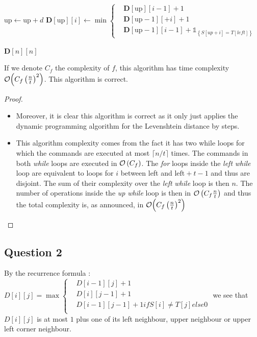 \documentclass{cours}
\begin{document}
\begin{algorithm}
\begin{algorithmic}
                \EndFor
            \EndWhile
            \State $\text{up} \gets \text{up} + d$
                    \State $\mathbf{D}[\text{up}][i] \gets \min{\begin{cases}&\mathbf{D}[\text{up}][i - 1] + 1 \\ &\mathbf{D}[\text{up} - 1][ + i] + 1\\ &\mathbf{D}[\text{up} - 1][i - 1] + \mathds{1}_{\left\{S[up + i] = T[left]\right\}} \end{cases}}$ \\ 
                \EndFor
        \EndWhile\\

        \Return $\mathbf{D}[n][n]$
    
    \end{algorithmic}
\end{algorithm}
\begin{proposition}
    If we denote $C_{f}$ the complexity of $f$, this algorithm has time complexity $\mathcal{O}{\left(C_{f}\left(\frac{n}{t}\right)^{2}\right)}$. This algorithm is correct.
\end{proposition}
\begin{proof}
    \begin{itemize}
        \item Moreover, it is clear this algorithm is correct as it only just applies the dynamic programming algorithm for the Levenshtein distance by steps.
        \item This algorithm complexity comes from the fact it has two while loops for which the commands are executed at most $\lceil n/t \rceil$ times. The commands in both \emph{while} loops are executed in $\mathcal{O}\left(C_{f}\right)$. The \emph{for} loops inside the \textit{left} \emph{while} loop are equivalent to loops for $i$ between left and $\text{left} + t - 1$ and thus are disjoint. The sum of their complexity over the \textit{left} \emph{while} loop is then $n$. The number of operations inside the \textit{up} \emph{while} loop is then in $\mathcal{O}\left(C_{f}\frac{n}{t}\right)$ and thus the total complexity is, as announced, in $\mathcal{O}{\left(C_{f}\left(\frac{n}{t}\right)^{2}\right)}$
    \end{itemize}
\end{proof}


\subsection{Question 2}
By the recurrence formula : $D[i][j] = \max 
\begin{cases}
    &D[i-1][j] + 1\\
    &D[i][j-1] + 1\\
    &D[i-1][j-1] + 1 if S[i] \neq T[j] else 0\\
\end{cases}$
we see that $D[i][j]$ is at most $1$ plus one of its left neighbour, upper neighbour or upper left corner neighbour.
\end{document}
